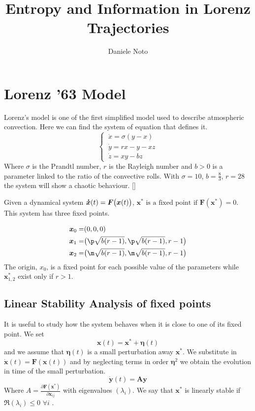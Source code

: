 \documentclass{article}
\title{Entropy and Information in Lorenz Trajectories}
\begin{document}
\author{Daniele Noto}
\maketitle
\section{Lorenz '63 Model}
Lorenz's model is one of the first simplified model used to describe atmospheric convection. 
Here we can find the system of equation that defines it.
\begin{equation}
\left\{\ \begin{array}{l}
\dot{x}=\sigma(y-x) \\
\dot{y}=r x-y-x z \\
\dot{z}=x y-b z 
\end{array}\right.
\end{equation}
Where $\sigma$ is the Prandtl number, $r$ is the Rayleigh number and $b>0$ is a parameter linked to the ratio of the convective rolls.
With $\sigma=10$, $b=\frac{8}{3}$, $r=28$ the system will show a chaotic behaviour. [\citeyear{LorenzArticle}]

Given a dynamical system $\boldsymbol{\dot{x}}(t)=\boldsymbol{F}\big{(}\boldsymbol{x}(t)\big{)}$,  $\boldsymbol{x}^* \text{ is a fixed point if } \boldsymbol{F}(\boldsymbol{x}^*)=0.$ 
This system has three fixed points.

\begin{equation}
\begin{split}
    \boldsymbol{x}_0=&(0,0,0)\\
    \boldsymbol{x}_{1}=&\big{(}
    \p\sqrt{b(r-1)},\p\sqrt{b(r-1)},r-1 \big{)}\\
    \boldsymbol{x}_{2}=&\big{(} \m\sqrt{b(r-1)},\m\sqrt{b(r-1)},r-1 \big{)}\\
\end{split}
\end{equation}
The origin, $x_0$, is a fixed point for each possible value of the parameters while $\boldsymbol{x}^{*}_{1,2}$ exist only if $r>1$.
\subsection{Linear Stability Analysis of fixed points}
It is useful to study how the system behaves when it is close to one of its fixed point. We set $$\boldsymbol{x}(t)=\boldsymbol{x}^*+\boldsymbol{\eta}(t)$$
and we assume that $\boldsymbol{\eta}(t)$ is a small perturbation away $\boldsymbol{x}^*$. We substitute in $\dot{\boldsymbol{x}}(t)=\boldsymbol{F}(\boldsymbol{x}(t))$ and by neglecting terms in order $\boldsymbol{\eta}^2$ we obtain the evolution in time of the small perturbation.
\begin{equation}
    \boldsymbol{\dot{y}}(t)=\boldsymbol{A}\boldsymbol{y}
\end{equation}
Where $A = \frac{\partial \boldsymbol{F}(\boldsymbol{x}^*) }{\partial \boldsymbol{x}_{ij}}$ with eigenvalues $(\lambda_i)$. We say that $\boldsymbol{x}^*$ is linearly stable if $\Re(\lambda_i)\leq0$ $\forall i $ .
\end{document}
